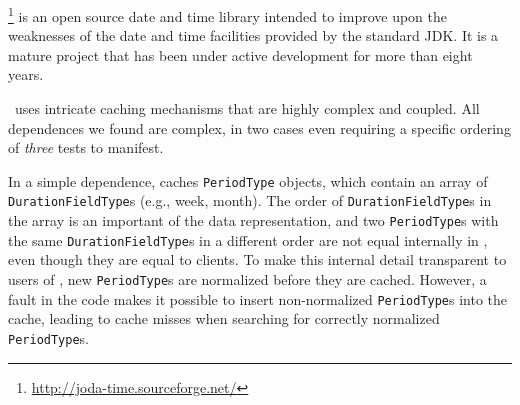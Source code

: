 \newcommand{\periodType}{\texttt{Period\-Type}}
\newcommand{\durationFieldType}{\texttt{Duration\-Field\-Type}}
\newcommand{\forFields}{\texttt{for\-Fields}}

\jodatime{}\footnote{\url{http://joda-time.sourceforge.net/}} is an open source
date and time library intended to improve upon the weaknesses of the
date and time facilities provided by the standard JDK.
It is a mature project that has been under active development
for more than eight years.

\jodatime\ uses intricate caching mechanisms that are high\-ly complex
and coupled.  All dependences we found are complex,
in two cases even requiring a
specific ordering of \emph{three} tests to manifest.

In a simple dependence, \jodatime{} caches \periodType{} objects, which 
contain an array of
\durationFieldType{}s (e.g., week, month). 
The order of \durationFieldType{}s in the array is an
important of the data representation, and 
two \periodType{}s with the same \durationFieldType{}s in a different
order are not equal internally in \jodatime, even though they are equal
to \jodatime clients.
To make this internal detail transparent to users of \jodatime, 
new \periodType{}s are normalized before they are cached. However, a fault in the code 
makes it possible to insert non-normalized \periodType{}s into the
cache, leading to cache misses when searching for correctly normalized
\periodType{}s.


